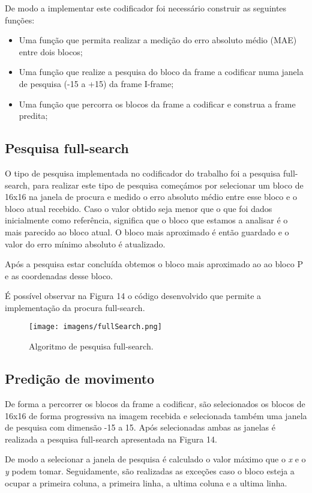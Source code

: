 \documentclass[12pt,a4paper]{article}
\begin{document}
De modo a implementar este codificador foi necessário construir as seguintes funções:
\begin{itemize}
\item Uma função que permita realizar a medição do erro absoluto médio (MAE) entre dois blocos;
\item Uma função que realize a pesquisa do bloco da frame a codificar numa janela de pesquisa (-15 a +15) da frame I-frame;
\item Uma função que percorra os blocos da frame a codificar e construa a frame predita;
\end{itemize}
\newpage
\subsection{Pesquisa full-search}
O tipo de pesquisa implementada no codificador do trabalho foi a pesquisa full-search, para realizar este tipo de pesquisa começámos por selecionar um bloco de 16x16 na janela de procura e medido o erro absoluto médio entre esse bloco e o bloco atual recebido. Caso o valor obtido seja menor que o que foi dados inicialmente como referência, significa que o bloco que estamos a analisar é o mais parecido ao bloco atual. O bloco mais aproximado é então guardado e o valor do erro mínimo absoluto é atualizado.

Após a pesquisa estar concluída obtemos o bloco mais aproximado ao ao bloco P e as coordenadas desse bloco. 

É possível observar na Figura 14 o código desenvolvido que permite a implementação da procura full-search.

\begin{figure}[h]
\texttt{[image: imagens/fullSearch.png]}
\centering
\caption{Algoritmo de pesquisa full-search.}
\end{figure}
\newpage
\subsection{Predição de movimento}
De forma a percorrer os blocos da frame a codificar, são selecionados os blocos de 16x16 de forma progressiva na imagem recebida e selecionada também uma janela de pesquisa com dimensão -15 a 15. Após selecionadas ambas as janelas é realizada a pesquisa full-search apresentada na Figura 14.

De modo a selecionar a janela de pesquisa é calculado o valor máximo que o \textit{x} e o \textit{y} podem tomar. Seguidamente, são realizadas as exceções caso o bloco esteja a ocupar a primeira coluna, a primeira linha, a ultima coluna e a ultima linha.
\end{document}
